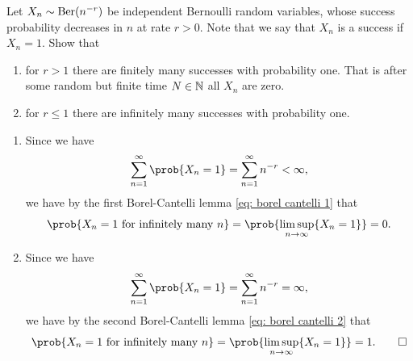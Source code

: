 
\begin{exercise}[subtitle={Infinitely often or never successful \Coffeecup}]
    Let \(X_n \sim \mathrm{Ber}(n^{-r})\) be independent Bernoulli random variables,
    whose success probability decreases in \(n\) at rate \(r > 0\). Note that we say
    that \(X_n\) is a success if \(X_n = 1\). Show that
    \begin{enumerate}[label=(\alph*)]
        \item\label{it: finitely many successes}
        for \(r > 1\) there are finitely many successes with probability one.
        That is after some random but finite time \(N\in \mathbb{N}\) all \(X_n\) are zero.

        \item\label{it: infinitely many successes}
        for \(r \le 1\) there are infinitely many successes with probability one.
    \end{enumerate}
\end{exercise}

\begin{solution}
\begin{enumerate}[wide=0pt]
    \item[\ref{it: finitely many successes}]
    Since we have
    \[
        \sum_{n=1}^\infty \prob{X_n = 1} = \sum_{n=1}^\infty n^{-r} < \infty,
    \]
    we have by the first Borel-Cantelli lemma \eqref{eq: borel cantelli 1} that
    \[
        \prob{X_n=1 \text{ for infinitely many } n} = \prob{\limsup_{n\to \infty} \set{X_n = 1}} = 0.
    \]

    \item[\ref{it: infinitely many successes}]
    Since we have
    \[
        \sum_{n=1}^\infty \prob{X_n = 1} = \sum_{n=1}^\infty n^{-r} = \infty,
    \]
    we have by the second Borel-Cantelli lemma \eqref{eq: borel cantelli 2} that
    \[
        \prob{X_n=1 \text{ for infinitely many } n} = \prob{\limsup_{n\to \infty} \set{X_n = 1}} = 1.
        \qedhere
    \]
\end{enumerate}
\end{solution}
